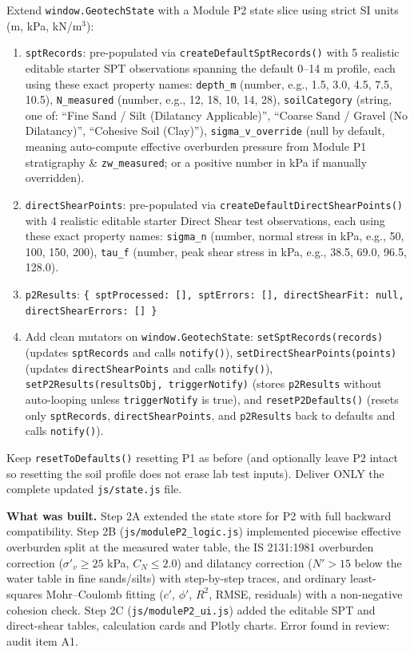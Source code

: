 \documentclass[11pt,a4paper]{article}
\newcommand{\code}[1]{\texttt{\small #1}}
\begin{document}
\begin{prompt}
Extend \code{window.GeotechState} with a Module P2 state slice using strict SI units (m, kPa, kN/m$^3$):
\begin{enumerate}
\item \code{sptRecords}: pre-populated via \code{createDefaultSptRecords()} with 5 realistic editable starter SPT
  observations spanning the default 0--14 m profile, each using these exact property names: \code{depth\_m} (number,
  e.g., 1.5, 3.0, 4.5, 7.5, 10.5), \code{N\_measured} (number, e.g., 12, 18, 10, 14, 28), \code{soilCategory}
  (string, one of: ``Fine Sand / Silt (Dilatancy Applicable)'', ``Coarse Sand / Gravel (No Dilatancy)'', ``Cohesive
  Soil (Clay)''), \code{sigma\_v\_override} (null by default, meaning auto-compute effective overburden pressure from
  Module P1 stratigraphy \& \code{zw\_measured}; or a positive number in kPa if manually overridden).
\item \code{directShearPoints}: pre-populated via \code{createDefaultDirectShearPoints()} with 4 realistic editable
  starter Direct Shear test observations, each using these exact property names: \code{sigma\_n} (number, normal
  stress in kPa, e.g., 50, 100, 150, 200), \code{tau\_f} (number, peak shear stress in kPa, e.g., 38.5, 69.0, 96.5,
  128.0).
\item \code{p2Results}: \code{\{ sptProcessed: [], sptErrors: [], directShearFit: null, directShearErrors: [] \}}
\item Add clean mutators on \code{window.GeotechState}: \code{setSptRecords(records)} (updates \code{sptRecords} and
  calls \code{notify()}), \code{setDirectShearPoints(points)} (updates \code{directShearPoints} and calls
  \code{notify()}), \code{setP2Results(resultsObj, triggerNotify)} (stores \code{p2Results} without auto-looping
  unless \code{triggerNotify} is true), and \code{resetP2Defaults()} (resets only \code{sptRecords},
  \code{directShearPoints}, and \code{p2Results} back to defaults and calls \code{notify()}).
\end{enumerate}
Keep \code{resetToDefaults()} resetting P1 as before (and optionally leave P2 intact so resetting the soil profile does
not erase lab test inputs). Deliver ONLY the complete updated \code{js/state.js} file.
\end{prompt}

\textbf{What was built.} Step 2A extended the state store for P2 with full backward compatibility. Step 2B
(\code{js/moduleP2\_logic.js}) implemented piecewise effective overburden split at the measured water table, the
IS 2131:1981 overburden correction ($\sigma'_v \ge 25$ kPa, $C_N \le 2.0$) and dilatancy correction ($N' > 15$ below
the water table in fine sands/silts) with step-by-step traces, and ordinary least-squares Mohr--Coulomb fitting ($c'$,
$\phi'$, $R^2$, RMSE, residuals) with a non-negative cohesion check. Step 2C (\code{js/moduleP2\_ui.js}) added the
editable SPT and direct-shear tables, calculation cards and Plotly charts. Error found in review: audit item A1.
\end{document}

